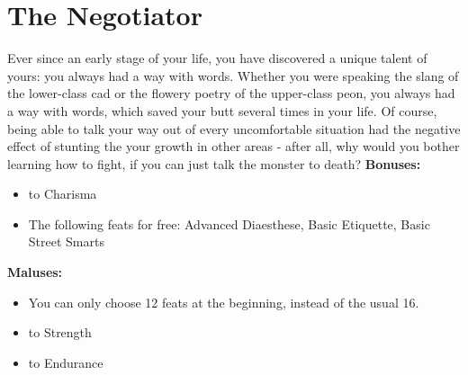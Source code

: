\section{The Negotiator}
Ever since an early stage of your life, you have discovered a unique talent of yours: you always had a way with words. Whether you were speaking the slang of the lower-class cad or the flowery poetry of the upper-class peon, you always had a way with words, which saved your butt several times in your life. Of course, being able to talk your way out of every uncomfortable situation had the negative effect of stunting the your growth in other areas - after all, why would you bother learning how to fight, if you can just talk the monster to death?\newline
\textbf{Bonuses:}
\begin{itemize}
	\item {} to Charisma
	\item The following feats for free: Advanced Diaesthese, Basic Etiquette, Basic Street Smarts
\end{itemize}
\textbf{Maluses:}
\begin{itemize}
	\item You can only choose 12 feats at the beginning, instead of the usual 16.
	\item {} to Strength
	\item {} to Endurance
\end{itemize}
